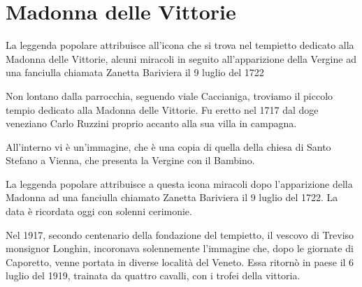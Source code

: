 \section{Madonna delle Vittorie}

La leggenda popolare attribuisce all'icona che si trova nel tempietto dedicato alla Madonna delle Vittorie, alcuni miracoli in seguito all'apparizione della Vergine ad una fanciulla chiamata Zanetta Bariviera il 9 luglio del 1722

Non lontano dalla parrocchia, seguendo viale Caccianiga, troviamo il piccolo tempio dedicato alla Madonna delle Vittorie. Fu eretto nel 1717 dal doge veneziano Carlo Ruzzini proprio accanto alla sua villa in campagna.

All'interno vi è un'immagine, che è una copia di quella della chiesa di Santo Stefano a Vienna, che presenta la Vergine con il Bambino.

La leggenda popolare attribuisce a questa icona miracoli dopo l'apparizione della Madonna ad una fanciulla chiamato Zanetta Bariviera il 9 luglio del 1722. La data è ricordata oggi con solenni cerimonie.

Nel 1917, secondo centenario della fondazione del tempietto, il vescovo di Treviso monsignor Longhin, incoronava solennemente l'immagine che, dopo le giornate di Caporetto, venne portata in diverse località del Veneto. Essa ritornò in paese il 6 luglio del 1919, trainata da quattro cavalli, con i trofei della vittoria.

